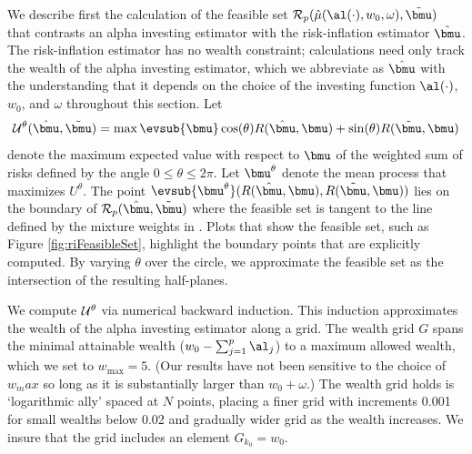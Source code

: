 \documentclass[12pt]{article}
\begin{document}
 We describe first the calculation of the feasible set ${\cal R}_p(\hat\mu(
 \al(\cdot), w_0, \omega), \tilde{\bmu})$ that contrasts an alpha investing
 estimator with the risk-inflation estimator $\tilde{\bmu}$.  The risk-inflation
 estimator has no wealth constraint; calculations need only track the wealth of
 the alpha investing estimator, which we abbreviate as $\hat{\bmu}$ with the
 understanding that it depends on the choice of the investing function
 $\al(\cdot)$, $w_0$, and $\omega$ throughout this section.  Let
 \begin{equation}
   {\cal U}^\theta(\hat{\bmu},\tilde{\bmu}) = 
       \max \evsub{\bmu} 
       \cos(\theta) R(\hat{\bmu}, \bmu) + \sin(\theta) R(\tilde{\bmu},\bmu) 
 \label{eq:U}
 \end{equation}
 denote the maximum expected value with respect to $\bmu$ of the weighted sum of
 risks defined by the angle $ 0 \le \theta \le 2 \pi$.  Let $\bmu^\theta$ denote
 the mean process that maximizes $U^\theta$.  The point
 $\evsub{\bmu^\theta}(R(\hat{\bmu}, \bmu), R(\tilde{\bmu}, \bmu))$ lies on
 the boundary of ${\cal R}_p(\hat{\bmu},\tilde{\bmu})$ where the feasible set is
 tangent to the line defined by the mixture weights in .  Plots that
 show the feasible set, such as Figure \ref{fig:riFeasibleSet}, highlight the
 boundary points that are explicitly computed.  By varying $\theta$ over the
 circle, we approximate the feasible set as the intersection of the resulting
 half-planes.

 
 We compute ${\cal U}^\theta$ via numerical backward induction.  This induction
 approximates the wealth of the alpha investing estimator along a grid.  The
 wealth grid $G$ spans the minimal attainable wealth ($w_0 - \sum_{j=1}^p
 \al_j$) to a maximum allowed wealth, which we set to $w_{\max} = 5$.  (Our
 results have not been sensitive to the choice of $w_max$ so long as it is
 substantially larger than $w_0 + \omega$.)  The wealth grid holds is
 `logarithmic ally' spaced at $N$ points, placing a finer grid with increments
 0.001 for small wealths below 0.02 and gradually wider grid as the wealth
 increases.  We insure that the grid includes an element $G_{k_0} = w_0$.
\end{document}
